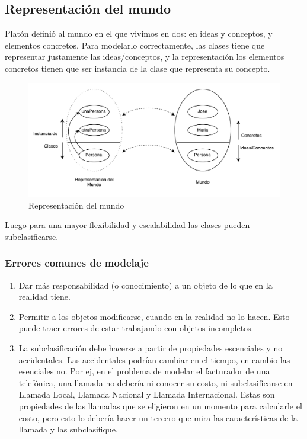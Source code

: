 \subsection{Representaci\'on del mundo}

Plat\'on defini\'o al mundo en el que vivimos en dos: en ideas y conceptos, y elementos concretos. Para modelarlo correctamente, las clases tiene que representar justamente las ideas/conceptos, y la representaci\'on los elementos concretos tienen que ser instancia de la clase que representa su concepto.

\begin{figure}[H]
  \begin{center}
  \includegraphics[width=\textwidth]{images/representacion_mundo.pdf}
  \end{center}
  \caption{Representaci\'on del mundo}
  \label{fig:representacion_mundo}
\end{figure}

Luego para una mayor flexibilidad y escalabilidad las clases pueden subclasificarse. 

\subsubsection{Errores comunes de modelaje}

\begin{enumerate}
 \item Dar m\'as responsabilidad (o conocimiento) a un objeto de lo que en la realidad tiene. 
 \item Permitir a los objetos modificarse, cuando en la realidad no lo hacen. Esto puede traer errores de estar trabajando con objetos incompletos.
 \item La subclasificaci\'on debe hacerse a partir de propiedades escenciales y no accidentales. Las accidentales podr\'ian cambiar en el tiempo, en cambio las esenciales no. Por ej, en el problema de modelar el facturador de una telef\'onica, una llamada no deber\'ia ni conocer su costo, ni subclasificarse en Llamada Local, Llamada Nacional y Llamada Internacional. Estas son propiedades de las llamadas que se eligieron en un momento para calcularle el costo, pero esto lo deber\'ia hacer un tercero que mira las caracter\'isticas de la llamada y las subclasifique. 
\end{enumerate}

